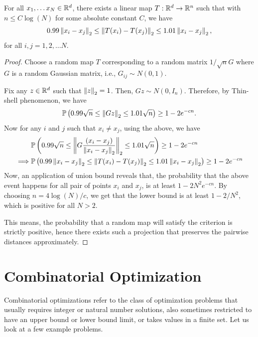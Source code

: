 \documentclass[12pt]{article}
\begin{document}
\begin{theorembox}
    For all $x_1, \dots x_N \in \mathbb{R}^d$, there exists a linear map $T: \mathbb{R}^d \rightarrow \mathbb{R}^n$ such that with $n \leq C\log(N)$ for some absolute constant $C$, we have 
    \begin{equation*}
        0.99 \left\Vert x_i - x_j \right\Vert_2 \leq \left\Vert T(x_i) - T(x_j) \right\Vert_2 \leq 1.01 \left\Vert x_i - x_j \right\Vert_2,
    \end{equation*}
    \noindent for all $i, j = 1, 2, \dots N$. 
\end{theorembox}

\begin{proof}
    Choose a random map $T$ corresponding to a random matrix $1/\sqrt{n}G$ where $G$ is a random Gaussian matrix, i.e., $G_{ij} \sim N(0, 1)$. 

    Fix any $z \in \mathbb{R}^d$ such that $\left\Vert z \right\Vert_2 = 1$. Then, $Gz \sim N(0, I_n)$. Therefore, by Thin-shell phenomenon, we have 
    \begin{equation*}
        \mathbb{P}\left( 0.99\sqrt{n} \leq \left\Vert Gz \right\Vert_2 \leq 1.01 \sqrt{n} \right) \geq 1 - 2e^{-cn}.
    \end{equation*}
    \noindent Now for any $i$ and $j$ such that $x_i \neq x_j$, using the above, we have 
    \begin{align*}
        & \mathbb{P}\left( 0.99\sqrt{n} \leq \left\Vert G\dfrac{(x_i - x_j)}{ \left\Vert x_i - x_j \right\Vert_2 }  \right\Vert_2 \leq 1.01 \sqrt{n} \right) \geq 1 - 2e^{-cn}\\
        \implies & \mathbb{P}\left( 0.99\left\Vert x_i - x_j \right\Vert_2 \leq \left\Vert T(x_i) - T(x_j) \right\Vert_2 \leq 1.01 \left\Vert x_i - x_j \right\Vert_2 \right) \geq 1 - 2e^{-cn}
    \end{align*}
    \noindent Now, an application of union bound reveals that, the probability that the above event happens for all pair of points $x_i$ and $x_j$, is at least $1 - 2N^2 e^{-cn}$. By choosing $n = 4\log(N)/c$, we get that the lower bound is at least $1 - 2/N^2$, which is positive for all $N > 2$. 

    This means, the probability that a random map will satisfy the criterion is strictly positive, hence there exists such a projection that preserves the pairwise distances approximately.
\end{proof}

\section{Combinatorial Optimization}

Combinatorial optimizations refer to the class of optimization problems that usually requires integer or natural number solutions, also sometimes restricted to have an upper bound or lower bound limit, or takes values in a finite set. Let us look at a few example problems.
\end{document}
